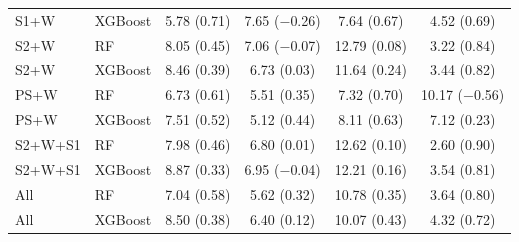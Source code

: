 \begin{table}[htbp]
\begin{tabular}{l l c c c c}
S1+W & XGBoost & 5.78 (0.71) & 7.65 ($-$0.26) & 7.64 (0.67) & 4.52 (0.69) \\
S2+W & RF & 8.05 (0.45) & 7.06 ($-$0.07) & 12.79 (0.08) & 3.22 (0.84) \\
S2+W & XGBoost & 8.46 (0.39) & 6.73 (0.03) & 11.64 (0.24) & 3.44 (0.82) \\
PS+W & RF & 6.73 (0.61) & 5.51 (0.35) & 7.32 (0.70) & 10.17 ($-$0.56) \\
PS+W & XGBoost & 7.51 (0.52) & 5.12 (0.44) & 8.11 (0.63) & 7.12 (0.23) \\
S2+W+S1 & RF & 7.98 (0.46) & 6.80 (0.01) & 12.62 (0.10) & 2.60 (0.90) \\
S2+W+S1 & XGBoost & 8.87 (0.33) & 6.95 ($-$0.04) & 12.21 (0.16) & 3.54 (0.81) \\
All & RF & 7.04 (0.58) & 5.62 (0.32) & 10.78 (0.35) & 3.64 (0.80) \\
All & XGBoost & 8.50 (0.38) & 6.40 (0.12) & 10.07 (0.43) & 4.32 (0.72) \\
\bottomrule
\end{tabular}
\end{table}
